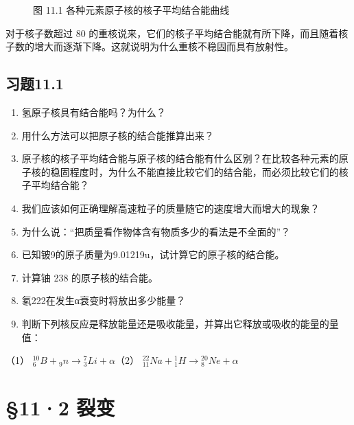 \begin{figure}
{%
}
\caption{图 11.1 各种元素原子核的核子平均结合能曲线}
\end{figure}

对于核子数超过 80
的重核说来，它们的核子平均结合能就有所下降，而且随着核子数的增大而逐渐下降。这就说明为什么重核不稳固而具有放射性。

\subsection{习题11.1}

\begin{enumerate}
\item
  氢原子核具有结合能吗？为什么？
\item
  用什么方法可以把原子核的结合能推算出来？
\item
  原子核的核子平均结合能与原子核的结合能有什么区别？在比较各种元素的原子核的稳固程度时，为什么不能直接比较它们的结合能，而必须比较它们的核子平均结合能？
\item
  我们应该如何正确理解高速粒子的质量随它的速度增大而增大的现象？
\item
  为什么说：``把质量看作物体含有物质多少的看法是不全面的''？
\item
  已知铍9的原子质量为9.01219u，试计算它的原子核的结合能。
\item
  计算铀 238 的原子核的结合能。
\item
  氡222在发生α衰变时将放出多少能量？
\item
  判断下列核反应是释放能量还是吸收能量，并算出它释放或吸收的能量的量值：
\end{enumerate}

（1）
\({}^{10}_{6}B + {}_{9}n \longrightarrow {}^{7}_{3}Li + \alpha\)（2）
\({}^{22}_{11}Na + {}^{1}_{1}H \longrightarrow {}^{20}_{8}Ne + \alpha\)

\section{§11·2 裂变}

